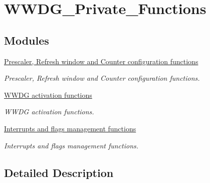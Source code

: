 \hypertarget{group___w_w_d_g___private___functions}{\section{W\-W\-D\-G\-\_\-\-Private\-\_\-\-Functions}
\label{group___w_w_d_g___private___functions}
}
\subsection*{Modules}
\begin{DoxyCompactItemize}
\item 
\hyperlink{group___w_w_d_g___group1}{Prescaler, Refresh window and Counter configuration functions}
\begin{DoxyCompactList}\small\item\em Prescaler, Refresh window and Counter configuration functions. \end{DoxyCompactList}\item 
\hyperlink{group___w_w_d_g___group2}{W\-W\-D\-G activation functions}
\begin{DoxyCompactList}\small\item\em W\-W\-D\-G activation functions. \end{DoxyCompactList}\item 
\hyperlink{group___w_w_d_g___group3}{Interrupts and flags management functions}
\begin{DoxyCompactList}\small\item\em Interrupts and flags management functions. \end{DoxyCompactList}\end{DoxyCompactItemize}


\subsection{Detailed Description}
